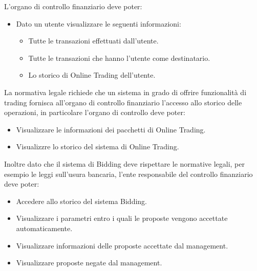 L'organo di controllo finanziario deve poter:
\begin{itemize}
    \item Dato un utente visualizzare le seguenti informazioni:
        \begin{itemize}
            \item Tutte le transazioni effettuati dall'utente.
            \item Tutte le transazioni che hanno l'utente come destinatario.
            \item Lo storico di Online Trading dell'utente.
        \end{itemize}
\end{itemize}
La normativa legale richiede che un sistema in grado di offrire funzionalit\`a di trading fornisca all'organo di controllo finanziario l'accesso allo storico delle operazioni, in particolare l'organo di controllo deve poter:
\begin{itemize}
    \item Visualizzare le informazioni dei pacchetti di Online Trading.
    \item Visualizzre lo storico del sistema di Online Trading.
\end{itemize}

Inoltre dato che il sistema di Bidding deve rispettare le normative legali, per esempio le leggi sull'usura bancaria, l'ente responsabile del controllo finanziario deve poter:
\begin{itemize}
    \item Accedere allo storico del sistema Bidding.
    \item Visualizzare i parametri entro i quali le proposte vengono accettate automaticamente.
    \item Visualizzare informazioni delle proposte accettate dal management.
    \item Visualizzare proposte negate dal management.
\end{itemize}





